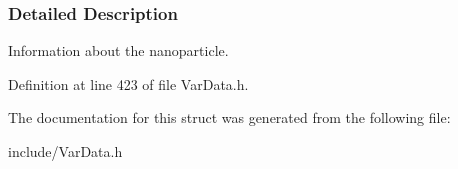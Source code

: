 \subsubsection{Detailed Description}
Information about the nanoparticle. 

Definition at line 423 of file Var\+Data.\+h.



The documentation for this struct was generated from the following file\+:\begin{DoxyCompactItemize}
\item 
include/Var\+Data.\+h\end{DoxyCompactItemize}
